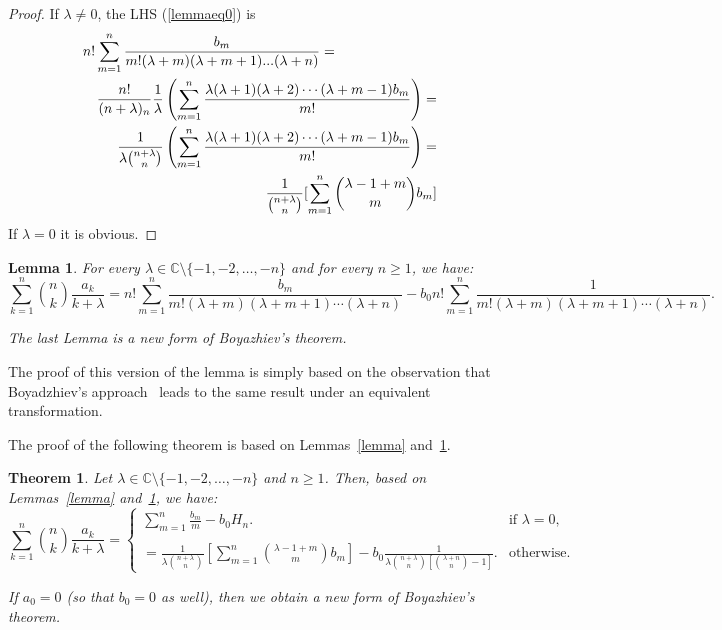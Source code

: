 \documentclass[a4paper,10pt,oneside]{article}
\newtheorem{lemma}{Lemma}[section]
\newtheorem{theorem}{Theorem}[section]
\theoremstyle{definition}
\theoremstyle{remark}
\begin{document}
 \begin{proof} If $\lambda\ne 0$, the LHS   (\ref{lemmaeq0}) is  
\begin{eqnarray*}
  \lefteqn{n!\sum_{m=1}^n\frac{b_m}{m!(\lambda +m)(\lambda +m+1)...(\lambda +n)}=}\\
    &&\frac{n!}{(n+\lambda)_n}\frac{1}{\lambda}\left(\sum_{m=1}^{n}\frac{\lambda{(\lambda+1)(\lambda+2)\cdots (\lambda+m-1)}b_m}{m!}\right)=\\
     &&\frac{1}{\lambda\binom{n+\lambda}{n}}\left(\sum_{m=1}^{n}\frac{\lambda{(\lambda+1)(\lambda+2)\cdots (\lambda+m-1)}b_m}{m!}\right)=\\
   &&\frac{1}{\binom{n+\lambda}{n}}[\sum_{m=1}^{n}\binom{\lambda-1+m}{m}b_m]\\
   \end{eqnarray*}
   If $\lambda =0$ it is obvious.
 \end{proof}

  
\begin{lemma}\label{lemmav}
For every \( \lambda \in \mathbb{C} \setminus \{-1, -2, \dotsc, -n\} \) and for every \( n \geq 1 \), we have:
\begin{equation}
\sum_{k=1}^n \binom{n}{k} \frac{a_k}{k+\lambda}
= n! \sum_{m=1}^n \frac{b_m}{m!(\lambda + m)(\lambda + m + 1) \cdots (\lambda + n)}
- b_0 n! \sum_{m=1}^n \frac{1}{m!(\lambda + m)(\lambda + m + 1) \cdots (\lambda + n)}.
\label{suce1}
\end{equation}

The last Lemma is  a new form of Boyazhiev's theorem.
\end{lemma}

\medskip

The proof of this version of the lemma is simply based on the observation that Boyadzhiev's approach~\cite{khristo} leads to the same result under an equivalent transformation.

\medskip

The proof of the following theorem is based on Lemmas~\ref{lemma} and~\ref{lemmav}.
\begin{theorem}\label{theorem}
 Let \( \lambda \in \mathbb{C} \setminus \{-1, -2, \dotsc, -n\} \) and \( n \geq 1 \). Then, based on Lemmas~\ref{lemma} and~\ref{lemmav}, we have:
\begin{equation}
\sum_{k=1}^n \binom{n}{k}\frac{a_k}{k+\lambda}=\begin{cases}\sum_{m=1}^n\frac{b_m}{m}
-b_0 H_n.&{\text{if }\lambda=0},\\\label{suce11}\\
=\frac{1}{\lambda \binom{n+\lambda}{n}}[\sum_{m=1}^{n}\binom{\lambda-1+m}{m}b_m]
-b_0\frac{1}{\lambda\binom{n+\lambda}{n} [\binom{\lambda+n}{n}-1]}.&{\text{otherwise.}}
\end{cases}
\end{equation}


If $a_0 = 0$ (so that $b_0 = 0$ as well), then we obtain a new form of Boyazhiev's theorem.

\end{theorem}
\end{document}

